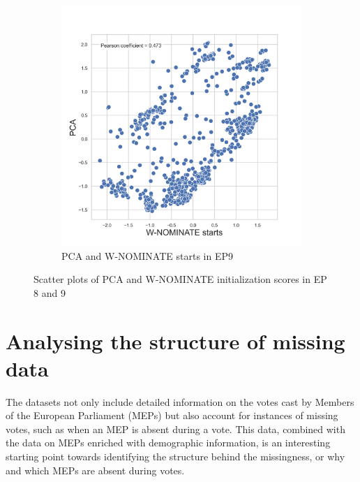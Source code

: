 \documentclass[a4paper,12pt]{report}
\begin{document}
\begin{figure}[H]
\begin{subfigure}[b]{0.48\textwidth}
                        \includegraphics[width=\textwidth]{Graphs/Scatterstartspca9}
                        \caption{PCA and W-NOMINATE starts in EP9}
                        \label{fig:pca_SCATTER_9}
                    \end{subfigure}
                    \caption
                    {Scatter plots of PCA and W-NOMINATE initialization scores in EP 8 and 9}
                    \label{fig:pca_scatter89}
                \end{figure}


    \chapter{Analysing the structure of missing data}\label{ch:analysing-the-structure-of-missing-data}
        The datasets not only include detailed information on the votes cast by Members of the European Parliament
        (MEPs)
        but also account for instances of missing votes, such as when an MEP is absent during a vote. This data,
        combined with the data on MEPs enriched with demographic information, is an interesting starting point towards
        identifying the structure behind the missingness, or why and which MEPs are absent during votes.
\end{document}
